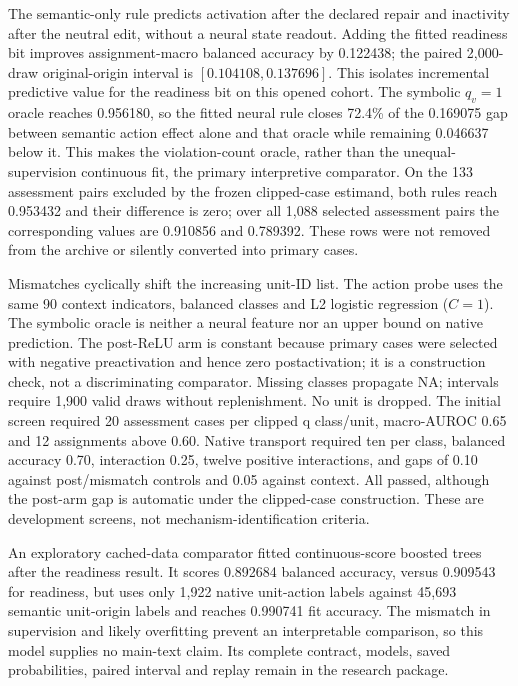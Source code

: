 \documentclass[
  british,
  11pt,
  a4paper,
]{article}
\begin{document}
The semantic-only rule predicts activation after the declared repair and
inactivity after the neutral edit, without a neural state readout.
Adding the fitted readiness bit improves assignment-macro balanced
accuracy by 0.122438; the paired 2,000-draw original-origin interval is
\([0.104108,0.137696]\). This isolates incremental predictive value for
the readiness bit on this opened cohort. The symbolic \(q_v=1\) oracle
reaches 0.956180, so the fitted neural rule closes 72.4\% of the
0.169075 gap between semantic action effect alone and that oracle while
remaining 0.046637 below it. This makes the violation-count oracle,
rather than the unequal-supervision continuous fit, the primary
interpretive comparator. On the 133 assessment pairs excluded by the
frozen clipped-case estimand, both rules reach 0.953432 and their
difference is zero; over all 1,088 selected assessment pairs the
corresponding values are 0.910856 and 0.789392. These rows were not
removed from the archive or silently converted into primary cases.

Mismatches cyclically shift the increasing unit-ID list. The action
probe uses the same 90 context indicators, balanced classes and L2
logistic regression (\(C=1\)). The symbolic oracle is neither a neural
feature nor an upper bound on native prediction. The post-ReLU arm is
constant because primary cases were selected with negative preactivation
and hence zero postactivation; it is a construction check, not a
discriminating comparator. Missing classes propagate NA; intervals
require 1,900 valid draws without replenishment. No unit is dropped. The
initial screen required 20 assessment cases per clipped q class/unit,
macro-AUROC 0.65 and 12 assignments above 0.60. Native transport
required ten per class, balanced accuracy 0.70, interaction 0.25, twelve
positive interactions, and gaps of 0.10 against post/mismatch controls
and 0.05 against context. All passed, although the post-arm gap is
automatic under the clipped-case construction. These are development
screens, not mechanism-identification criteria.

An exploratory cached-data comparator fitted continuous-score boosted
trees after the readiness result. It scores 0.892684 balanced accuracy,
versus 0.909543 for readiness, but uses only 1,922 native unit-action
labels against 45,693 semantic unit-origin labels and reaches 0.990741
fit accuracy. The mismatch in supervision and likely overfitting prevent
an interpretable comparison, so this model supplies no main-text claim.
Its complete contract, models, saved probabilities, paired interval and
replay remain in the research package.
\end{document}
